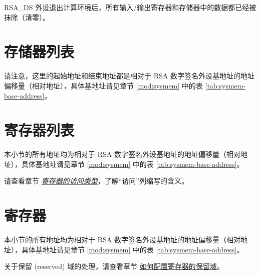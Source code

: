 \documentclass[main\_\_CN.tex]{subfiles}
\begin{document}
RSA\_DS 外设退出计算环境后，所有输入/输出寄存器和存储器中的数据都已经被抹除（清零）。



\newpage
\section{ 存储器列表 }
\label{sec:digsig-mem-summ}

请注意，这里的起始地址和结束地址都是相对于 RSA 数字签名外设基地址的地址偏移量（相对地址），具体基地址请见章节 \ref{mod:sysmem} \textit{} 中的表 \ref{tab:sysmem-base-address}。







\newpage
\hypertarget{digsig-reg-summ}{}
\section{寄存器列表}
\label{sec:digsig-reg-summ}

本小节的所有地址均为相对于 RSA 数字签名外设基地址的地址偏移量（相对地址），具体基地址请见章节 \ref{mod:sysmem} \textit{} 中的表 \ref{tab:sysmem-base-address}。

请查看章节 \hyperref[glossary-access-types]{\textit{寄存器的访问类型}}，了解“访问”列缩写的含义。






\newpage
\section{寄存器}

本小节的所有地址均为相对于 RSA 数字签名外设基地址的地址偏移量（相对地址），具体基地址请见章节 \ref{mod:sysmem} \textit{} 中的表 \ref{tab:sysmem-base-address}。

关于保留 (reserved) 域的处理，请查看章节 \hyperref[programming-reserved-field]{如何配置寄存器的保留域}。


\end{document}
